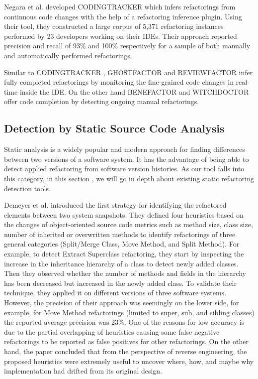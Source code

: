 \documentclass[letterpaper,12pt,onecolumn,final]{report}
\begin{document}
Negara et al. \cite{Negara2013} developed CODINGTRACKER which infers refactorings from continuous code changes with the help of a refactoring inference plugin. Using their tool, they constructed a large corpus of 5,371 refactoring instances performed by 23 developers working on their IDEs. Their approach reported precision and recall of 93\% and 100\% respectively for a sample of both manually and automatically performed refactorings.

Similar to CODINGTRACKER \cite{Negara2013}, GHOSTFACTOR \cite{Ge2014} and REVIEWFACTOR \cite{Ge2017} infer fully completed refactorings by monitoring the fine-grained code changes in real-time inside the IDE. On the other hand BENEFACTOR \cite{Ge2012} and WITCHDOCTOR \cite{Foster2012} offer code completion by detecting ongoing manual refactorings.

\subsection{Detection by Static Source Code Analysis}
Static analysis is a widely popular and modern approach for finding differences between two versions of a software system. It has the advantage of being able to detect applied refactoring  from software version histories. As our tool falls into this category, in this section , we will go in depth about existing static refactoring detection tools.

Demeyer et al. \cite{Demeyer2000} introduced the first strategy for identifying the refactored elements between two system snapshots. They defined four heuristics based on the changes of object-oriented source code metrics such as method size, class size, number of inherited or overwritten methods to identify refactorings of three general categories (Split/Merge Class, Move Method, and Split Method). For example, to detect Extract Superclass refactoring, they start by inspecting the increase in the inheritance hierarchy of a class to detect newly added classes. Then they observed whether the number of methods and fields in the hierarchy has been decreased but increased in the newly added class. To validate their technique, they applied it on different versions of three software systems. However, the precision of their approach was seemingly on the lower side, for example, for Move Method refactorings (limited to super, sub, and sibling classes) the reported average precision was 23\%. One of the reasons for low accuracy is due to the partial overlapping of heuristics causing some false negative refactorings to be reported as false positives for other refactorings. On the other hand, the paper concluded that from the perspective of reverse engineering, the proposed heuristics were extremely useful to uncover where, how, and maybe why implementation had drifted from its original design.
\end{document}
